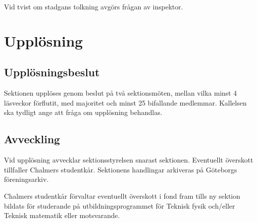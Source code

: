 \documentclass{styrdokument}
\begin{document}
\? Vid tvist om stadgans tolkning avgörs frågan av inspektor.

\section{Upplösning}
\subsection{Upplösningsbeslut}

\? Sektionen upplöses genom beslut på två sektionsmöten, mellan vilka minst 4 läsveckor förflutit, med  majoritet och minst 25 bifallande medlemmar.
Kallelsen ska tydligt ange att fråga om upplösning behandlas.
\label{beslut.upplosning}

\subsection{Avveckling}

\? Vid upplösning avvecklar sektionsstyrelsen snarast sektionen.
Eventuellt överskott tillfaller Chalmers studentkår.
Sektionens handlingar arkiveras på Göteborgs föreningsarkiv.

\? Chalmers studentkår förvaltar eventuellt överskott i fond fram tills ny sektion bildats för studerande på utbildningsprogrammet för Teknisk fysik och/eller Teknisk matematik eller motsvarande.
\end{document}
